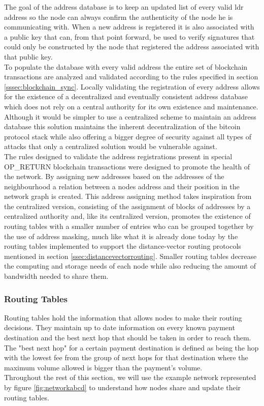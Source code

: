 The goal of the address database is to keep an updated list of every valid \acrshort{ldr} address so the node can always confirm the authenticity of the node he is communicating with. When a new address is registered it is also associated with a public key that can, from that point forward, be used to verify signatures that could only be constructed by the node that registered the address associated with that public key.\\
To populate the database with every valid address the entire set of blockchain transactions are analyzed and validated according to the rules specified in section \ref{sssec:blockchain_sync}. Locally validating the registration of every address allows for the existence of a decentralized and eventually consistent address database which does not rely on a central authority for its own existence and maintenance. Although it would be simpler to use a centralized scheme to maintain an address database this solution maintains the inherent decentralization of the bitcoin protocol stack while also offering a bigger degree of security against all types of attacks that only a centralized solution would be vulnerable against. \\
The rules designed to validate the address registrations present in special OP\_RETURN blockchain transactions were designed to promote the health of the network. By assigning new addresses based on the addresses of the neighbourhood a relation between a nodes address and their position in the network graph is created. This address assigning method takes inspiration from the centralized version, consisting of the assignment of blocks of addresses by a centralized authority and, like its centralized version, promotes the existence of routing tables with a smaller number of entries who can be grouped together by the use of address masking, much like what it is already done today by the routing tables implemented to support the distance-vector routing protocols mentioned in section \ref{ssec:distancevectorrouting}. Smaller routing tables decrease the computing and storage needs of each node while also reducing the amount of bandwidth needed to share them.

\subsubsection{Routing Tables}
\label{sssec:routing_tables}

Routing tables hold the information that allows nodes to make their routing decisions. They maintain up to date information on every known payment destination and the best next hop that should be taken in order to reach them. The "best next hop" for a certain payment destination is defined as being the hop with the lowest fee from the group of next hops for that destination where the maximum volume allowed is bigger than the payment's volume. \\
Throughout the rest of this section, we will use the example network represented by figure \ref{fig:networkabcd} to understand how nodes share and update their routing tables.\\

